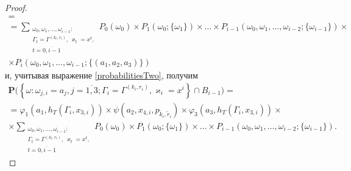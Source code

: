 \documentclass[a4paper,twoside]{article}
\theoremstyle{theorem}
\theoremstyle{remark}
\renewcommand{\Pr}{{\mathbf P}}
\begin{document}
\begin{proof}
\begin{multline*}
= \\ =\sum_{\substack{\omega_0, \omega_1,\ldots, \omega_{i-1} \colon \\ \Gamma_t=\Gamma^{(k_t,r_t)},\, \varkappa_t=x^t, \\ t=\overline{0,i-1}}} P_0(\omega_0)\times P_1(\omega_0;\{\omega_1\})\times\ldots \times P_{i-1}(\omega_0,\omega_1,\ldots, \omega_{i-2};\{\omega_{i-1}\})
\times \\[-2ex] \times P_i(\omega_0,\omega_1,\ldots, \omega_{i-1};\{(a_1, a_2, a_3)\})
\end{multline*}
и, учитывая выражение \eqref{probabilitiesTwo}, получим
\begin{multline}
\Pr\bigl( \left\{ \omega \colon \omega_{j,i} = a_j, j=\overline{1,3}; \Gamma_i=\Gamma^{(k_i,r_i)}, \varkappa_i=x^i\right\} \cap B_{i-1}\bigr) 
=\\=\varphi_1(a_1,h_T(\Gamma_i,x_{3,i})) \times \psi(a_2,x_{4,i}, p_{\tilde{k}_i,\tilde{r}_i}) \times  \varphi_3(a_3,h_T(\Gamma_i,x_{3,i}))
\times \\ \times \sum_{\substack{\omega_0, \omega_1,\ldots, \omega_{i-1} \colon \\ \Gamma_t=\Gamma^{(k_t,r_t)},\, \varkappa_t=x^t,\\ t=\overline{0,i-1}}} P_0(\omega_0)\times P_1(\omega_0;\{\omega_1\})\times \ldots \times P_{i-1}(\omega_0,\omega_1,\ldots, \omega_{i-2};\{\omega_{i-1}\}).
\label{Construction:4}
\end{multline}


\end{proof}
\end{document}
